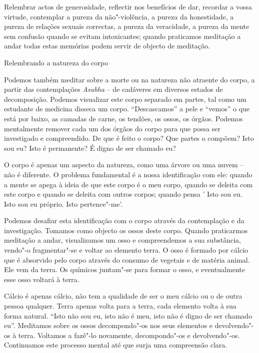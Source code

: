 Relembrar actos de generosidade, reflectir nos benefícios de dar, recordar
a vossa virtude, contemplar a pureza da não"-violência, a pureza da
honestidade, a pureza de relações sexuais correctas, a pureza da
veracidade, a pureza da mente sem confusão quando se evitam
intoxicantes; quando praticamos meditação a andar todas estas memórias
podem servir de objecto de meditação.

\begin{siderule-quote}
  Relembrando a natureza do corpo
\end{siderule-quote}

Podemos também meditar sobre a morte ou na natureza não atraente do
corpo, a partir das contemplações \emph{Asubha} -- de cadáveres em
diversos estados de decomposição. Podemos visualizar este corpo separado
em partes, tal como um estudante de medicina disseca um corpo.
``Descascamos'' a pele e ``vemos'' o que está por baixo, as camadas de
carne, os tendões, os ossos, os órgãos. Podemos mentalmente remover cada
um dos órgãos do corpo para que possa ser investigado e compreendido. De
que é feito o corpo? Que partes o compõem? Isto sou eu? Isto é
permanente? É digno de ser chamado eu?

O corpo é apenas um aspecto da natureza, como uma árvore ou uma nuvem --
não é diferente. O problema fundamental é a nossa identificação com ele:
quando a mente se apega à ideia de que este corpo é o meu corpo, quando
se deleita com este corpo e quando se deleita com outros corpos; quando
pensa ' Isto sou eu. Isto sou eu próprio. Isto pertence"-me'.

Podemos desafiar esta identificação com o corpo através da contemplação
e da investigação. Tomamos como objecto os ossos deste corpo. Quando
praticarmos meditação a andar, visualizamos um osso e compreendemos a
sua substância, vendo"-o fragmentar"-se e voltar ao elemento terra. O osso
é formado por cálcio que é absorvido pelo corpo através do consumo de
vegetais e de matéria animal. Ele vem da terra. Os químicos juntam"-se
para formar o osso, e eventualmente esse osso voltará à terra.

Cálcio é apenas cálcio, não tem a qualidade de ser o meu cálcio ou o de
outra pessoa qualquer. Terra apenas volta para a terra, cada elemento
volta à sua forma natural. ``Isto não sou eu, isto não é meu, isto não é
digno de ser chamado eu''. Meditamos sobre os ossos decompondo"-os nos
seus elementos e devolvendo"-os à terra. Voltamos a fazê"-lo novamente,
decompondo"-os e devolvendo"-os. Continuamos este processo mental até que
surja uma compreensão clara.

